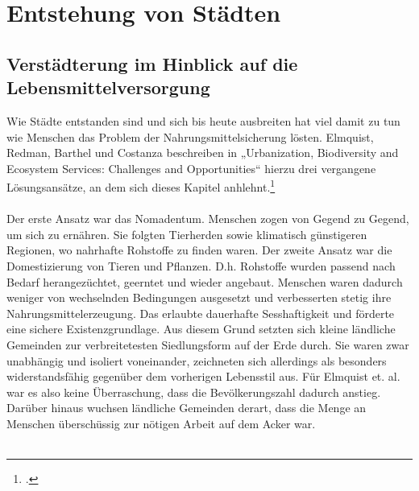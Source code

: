 \documentclass{scrartcl}
\begin{document}
\section{Entstehung von Städten}
\subsection{Verstädterung im Hinblick auf die Lebensmittelversorgung}
Wie Städte entstanden sind und sich bis heute ausbreiten hat viel damit zu tun wie Menschen das Problem der Nahrungsmittelsicherung lösten. Elmquist, Redman, Barthel und Costanza beschreiben in „Urbanization, Biodiversity and Ecosystem Services: Challenges and Opportunities“ hierzu drei vergangene Lösungsansätze, an dem sich dieses Kapitel anhlehnt.\footcite[S.14ff]{Elmqvist2013} 
\\
\\ 
Der erste Ansatz war das Nomadentum. Menschen zogen von Gegend zu Gegend, um sich zu ernähren. Sie folgten Tierherden sowie klimatisch günstigeren Regionen, wo nahrhafte Rohstoffe zu finden waren. Der zweite Ansatz war die Domestizierung von Tieren und Pflanzen. D.h. Rohstoffe wurden passend nach Bedarf herangezüchtet, geerntet und wieder angebaut. Menschen waren dadurch weniger von wechselnden Bedingungen ausgesetzt und verbesserten stetig ihre Nahrungsmittelerzeugung. Das erlaubte dauerhafte Sesshaftigkeit und förderte eine sichere Existenzgrundlage. Aus diesem Grund setzten sich kleine ländliche Gemeinden zur verbreitetesten Siedlungsform auf der Erde durch. Sie waren zwar unabhängig und isoliert voneinander, zeichneten sich allerdings als besonders widerstandsfähig gegenüber dem vorherigen Lebensstil aus. Für Elmquist et. al. war es also keine Überraschung, dass die Bevölkerungszahl dadurch anstieg. Darüber hinaus wuchsen ländliche Gemeinden derart, dass die Menge an Menschen überschüssig zur nötigen Arbeit auf dem Acker war. \\
\\
\end{document}
